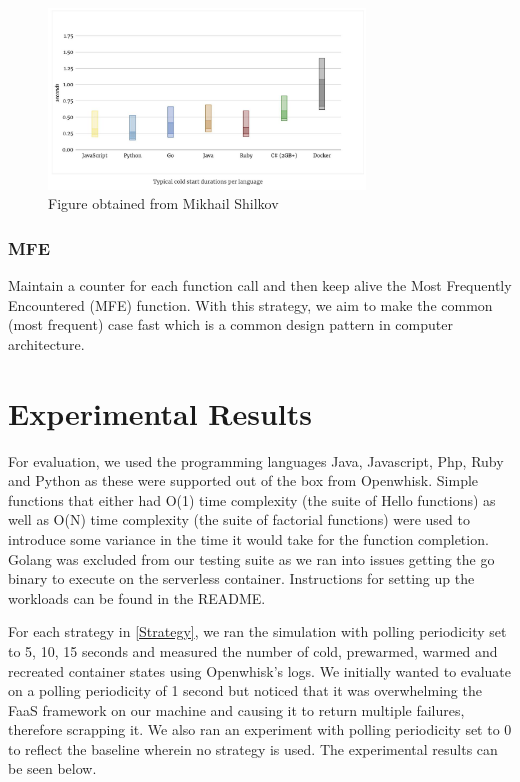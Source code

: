 \documentclass{article}
\begin{document}
\begin{figure}
    \center
    \includegraphics[width=0.75\textwidth]{function_cold_start_times.jpg}
    \caption{\label{Cold start times}Figure obtained from Mikhail Shilkov}
\end{figure}


\subsubsection{MFE}

Maintain a counter for each function call and then keep alive the Most Frequently Encountered (MFE) function. With this strategy, we aim to make the common (most frequent) case fast which is a common design pattern in computer architecture.

\section{Experimental Results}

For evaluation, we used the programming languages Java, Javascript, Php, Ruby and Python as these were supported out of the box from Openwhisk. Simple functions that either had O(1) time complexity (the suite of Hello functions) as well as O(N) time complexity (the suite of factorial functions) were used to introduce some variance in the time it would take for the function completion. Golang was excluded from our testing suite as we ran into issues getting the go binary to execute on the serverless container. Instructions for setting up the workloads can be found in the README.

For each strategy in \ref{Strategy}, we ran the simulation with polling periodicity set to 5, 10, 15 seconds and measured the number of cold, prewarmed, warmed and recreated container states using Openwhisk's logs. We initially wanted to evaluate on a polling periodicity of 1 second but noticed that it was overwhelming the FaaS framework on our machine and causing it to return multiple failures, therefore scrapping it. We also ran an experiment with polling periodicity set to 0 to reflect the baseline wherein no strategy is used. The experimental results can be seen below.
\end{document}
